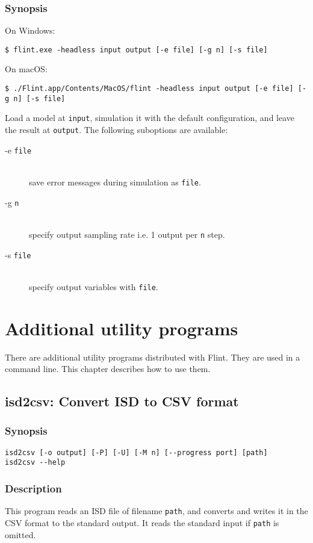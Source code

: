\documentclass[a4paper,10pt]{report}
\begin{document}
\subsection{Synopsis}
On Windows:
\begin{verbatim}
$ flint.exe -headless input output [-e file] [-g n] [-s file]
\end{verbatim}
On macOS:
\begin{verbatim}
$ ./Flint.app/Contents/MacOS/flint -headless input output [-e file] [-g n] [-s file]
\end{verbatim}
Load a model at {\tt input}, simulation it with the default configuration,
and leave the result at {\tt output}.
The following suboptions are available:
\begin{description}
\item[-e {\tt file}] \hfill \\
  save error messages during simulation as {\tt file}.
\item[-g {\tt n}] \hfill \\
  specify output sampling rate i.e. 1 output per {\tt n} step.
\item[-s {\tt file}] \hfill \\
  specify output variables with {\tt file}.
\end{description}


\chapter{Additional utility programs}
There are additional utility programs distributed with Flint.
They are used in a command line.
This chapter describes how to use them.

\section{isd2csv: Convert ISD to CSV format}

\subsection{Synopsis}
\begin{verbatim}
isd2csv [-o output] [-P] [-U] [-M n] [--progress port] [path]
isd2csv --help
\end{verbatim}

\subsection{Description}
This program reads an ISD file of filename {\tt path}, and converts and writes
it in the CSV format to the standard output.
It reads the standard input if {\tt path} is omitted.
\end{document}
